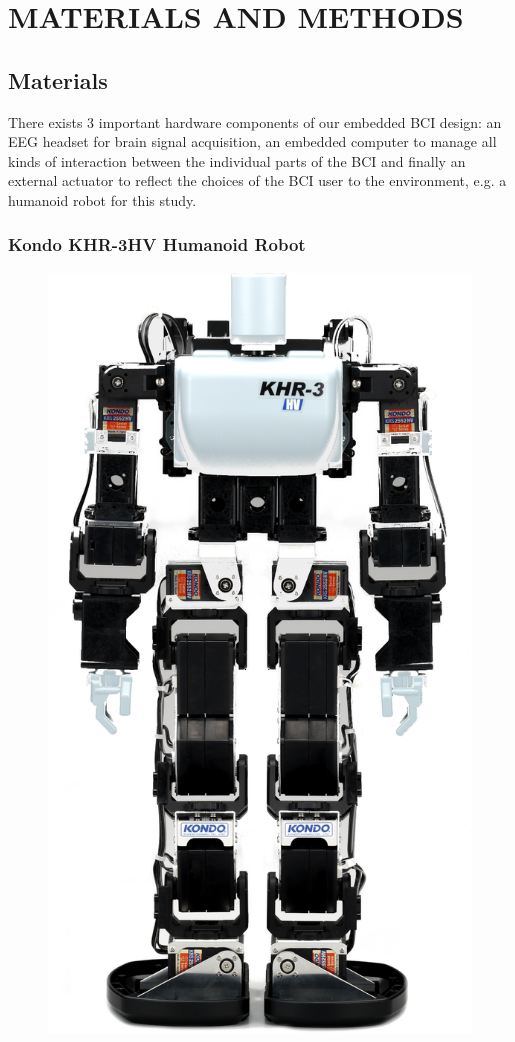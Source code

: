\documentclass[12pt]{article}
\newcommand\mysection[1]{\vspace*{-0.35cm}\section{#1}\vspace*{6pt}\thispagestyle{empty}}
\newcommand\mysubsection[1]{\subsection{#1}}
\newcommand\mysubsubsection[1]{\subsubsection{#1}}
\numberwithin{equation}{section}
\numberwithin{figure}{section}
\numberwithin{table}{section}
\begin{document}
\clearpage
\vspace*{-0.35cm}
\mysection{MATERIALS AND METHODS}

\mysubsection{Materials}
\par{
    There exists 3 important hardware components of our embedded BCI
    design: an EEG headset for brain signal acquisition, an embedded
    computer to manage all kinds of interaction between the
    individual parts of the BCI and finally an external actuator to reflect
    the choices of the BCI user to the environment, e.g. a humanoid robot
    for this study.
}
\mysubsubsection{Kondo KHR-3HV Humanoid Robot}
\par{
    \begin{figure}[ht]
        \centering
        \includegraphics[scale=0.7]{images/kondo}

\end{figure}}
\end{document}
